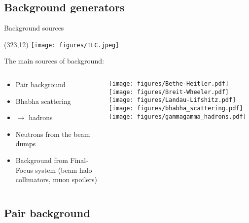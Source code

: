 \documentclass[xcolor={dvipsnames}]{beamer}
\newcommand{\ilclogo}{
  \setlength{\TPHorizModule}{1pt}
  \setlength{\TPVertModule}{1pt}
  \begin{textblock}{1}(323,12)
   \texttt{[image: figures/ILC.jpeg]}
  \end{textblock}
}
\begin{document}
\subsection{Background generators}
\begin{frame}{Background sources}
\ilclogo
The main sources of background:
\begin{columns}
 \begin{column}{0.55\textwidth}
  \begin{itemize}
    \item Pair background
    \item Bhabha scattering
    \item \textgamma \textgamma $\rightarrow$ hadrons
    \item Neutrons from the beam dumps
    \item Background from Final-Focus system (beam halo collimators, muon spoilers)
  \end{itemize}
 \end{column}
 \begin{column}{0.45\textwidth}
 \texttt{[image: figures/Bethe-Heitler.pdf]}
 \texttt{[image: figures/Breit-Wheeler.pdf]}
 \texttt{[image: figures/Landau-Lifshitz.pdf]}\\
 \texttt{[image: figures/bhabha\_scattering.pdf]} 
 \texttt{[image: figures/gammagamma\_hadrons.pdf]}
 \end{column}
\end{columns}
\end{frame}

\subsection{Pair background}
\end{document}
